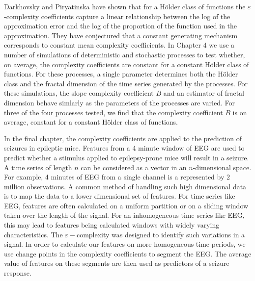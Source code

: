 Darkhovsky and Piryatinska have shown that for a H\"older class of functions the $\varepsilon$-complexity coefficients capture a linear relationship between the log of the approximation error and the log of the proportion of the function used in the approximation. They have conjectured that a 
constant generating mechanism corresponds to constant mean complexity coefficients. 
In Chapter 4 we use a number of simulations of deterministic and stochastic processes to test whether, on average, 
the complexity coefficients are constant for a 
constant H\"older class of functions. For these processes, a single parameter determines both the H\"older class and the fractal dimension of the time series generated
by the processes. For these simulations, the slope
complexity coefficient $B$ and an estimator
of fractal dimension behave simlarly as the parameters of
the processes are varied. For three of the four processes tested,
we find that the complexity coefficient $B$ is
on average, constant for a constant H\"older class of functions.
 

In the final chapter, the complexity coefficients are applied
to the prediction of seizures in epileptic mice. Features from a 4 minute window of EEG are used to predict whether a stimulus
applied to epilepsy-prone mice will result in a seizure. 
A time series of length $n$ can be considered 
as a vector in an $n$-dimensional space. For example, 4 minutes of 
EEG from a single channel is a represented by 2 million 
observations.
A common method of handling such high dimensional data is 
to map the data to a lower dimensional set of features. For time series like EEG, features are often calculated 
on a uniform partition or on a sliding
window taken over the length of the signal. For an 
inhomogeneous time series like EEG, 
this may lead to features being calculated windows
with widely varying characteristics.
The $\varepsilon-$complexity 
was designed to identify such variations in a signal.
In order to calculate our features on more homogeneous 
time periods, we use change points in the 
complexity coefficients to segment the EEG.
The average value of features on these segments are then used as predictors of a seizure response. 

